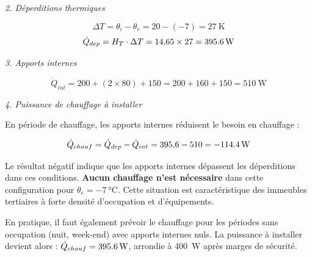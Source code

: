 \textit{2. Déperditions thermiques}

\[
  \Delta T = \theta_i - \theta_e = 20 - (-7) = \SI{27}{\kelvin}
\]
\[
  \dot{Q}_{dep} = H_T \cdot \Delta T = 14{,}65 \times 27 = \SI{395{,}6}{\watt}
\]

\textit{3. Apports internes}

\[
  \dot{Q}_{int} = 200 + (2 \times 80) + 150 = 200 + 160 + 150 = \SI{510}{\watt}
\]

\textit{4. Puissance de chauffage à installer}

En période de chauffage, les apports internes réduisent le besoin en chauffage :

\[
  \dot{Q}_{chauf} = \dot{Q}_{dep} - \dot{Q}_{int} = 395{,}6 - 510 = \SI{-114{,}4}{\watt}
\]

Le résultat négatif indique que les apports internes dépassent les déperditions dans ces
conditions. \textbf{Aucun chauffage n'est nécessaire} dans cette configuration pour \(\theta_e
= \SI{-7}{\degreeCelsius}\). Cette situation est caractéristique des immeubles tertiaires à
forte densité d'occupation et d'équipements.

\begin{attention}
  En pratique, il faut également prévoir le chauffage pour les périodes sans occupation
  (nuit, week-end) avec apports internes nuls. La puissance à installer devient alors :
  \(\dot{Q}_{chauf} = \SI{395{,}6}{\watt}\), arrondie à \SI{400}{\watt} après marges de sécurité.
\end{attention}
